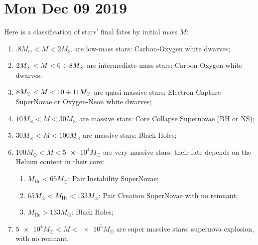 \documentclass[main.tex]{subfiles}
\begin{document}
\section*{Mon Dec 09 2019}


Here is a classification of stars' final fates by initial mass \(M\): 
\begin{enumerate}
    \item \(\num{.8} M_{\odot} < M < \num{2} M_{\odot}\) are low-mass stars: Carbon-Oxygen white dwarves;
    \item \(\num{2} M_{\odot} < M < 6 \divisionsymbol 8 M_{\odot}\) are intermediate-mass stars: Carbon-Oxygen white dwarves;
    \item \(\num{8} M_{\odot} < M < 10 \divisionsymbol 11 M_{\odot}\) are quasi-massive stars: Electron Capture SuperNovae or Oxygen-Neon white dwarves;
    \item \(10 M_{\odot} < M < 30 M_{\odot}\) are massive stars: Core Collapse Supernovae (BH or NS);
    \item \(30 M_{\odot} < M < 100 M_{\odot}\) are massive stars: Black Holes;
    \item \(100 M_{\odot} < M < \num{5e4} M_{\odot}\) are very massive stars: their fate depends on the Helium content in their core: \begin{enumerate}
        \item \(M _{\text{He}} < 65 M_{\odot}\): Pair Instability SuperNovae;
        \item \(65 M_{\odot} < M _{\text{He}} < 133 M_{\odot}\): Pair Creation SuperNovae with no remnant;
        \item \(M _{\text{He}} > 133 M_{\odot}\): Black Holes;
    \end{enumerate}
    \item \(\num{5e4} M_{\odot} < M < \num{e5} M_{\odot}\)  are super massive stars: supernova explosion, with no remnant.
\end{enumerate}



\end{document}
